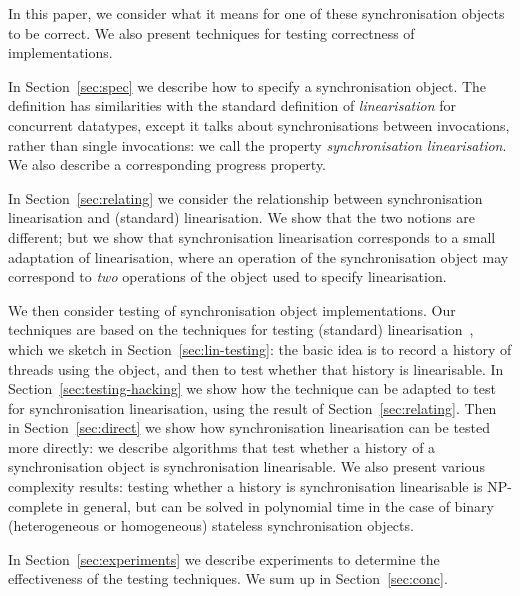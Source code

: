 
In this paper, we consider what it means for one of these synchronisation
objects to be correct.  We also present techniques for testing correctness of
implementations.

In Section~\ref{sec:spec} we describe how to specify a synchronisation
object.  The definition has similarities with the standard definition of
\emph{linearisation} for concurrent datatypes, except it talks about
synchronisations between invocations, rather than single invocations: we call
the property \emph{synchronisation linearisation}.  We also describe a
corresponding progress property.

In Section~\ref{sec:relating} we consider the relationship between
synchronisation linearisation and (standard) linearisation.  We show that the
two notions are different; but we show that synchronisation linearisation
corresponds to a small adaptation of linearisation, where an
operation of the synchronisation object may correspond to \emph{two} operations
of the object used to specify linearisation.  

We then consider testing of synchronisation object implementations.  Our
techniques are based on the techniques for testing (standard)
linearisation~\cite{gavin:lin-testing}, which we sketch in
Section~\ref{sec:lin-testing}: the basic idea is to record a history of
threads using the object, and then to test whether that history is
linearisable.
%
In Section~\ref{sec:testing-hacking} we show how the technique can be adapted
to test for synchronisation linearisation, using the result of
Section~\ref{sec:relating}.  Then in Section~\ref{sec:direct} we show how
synchronisation linearisation can be tested more directly: we describe
algorithms that test whether a history of a synchronisation object is
synchronisation linearisable.  We also present various
complexity results: testing whether a history is synchronisation linearisable
is NP-complete in general, but can be solved in polynomial time in the case of
binary (heterogeneous or homogeneous) stateless synchronisation objects.


In Section~\ref{sec:experiments} we describe experiments to determine the
effectiveness of the testing techniques.  We sum up in
Section~\ref{sec:conc}. 

